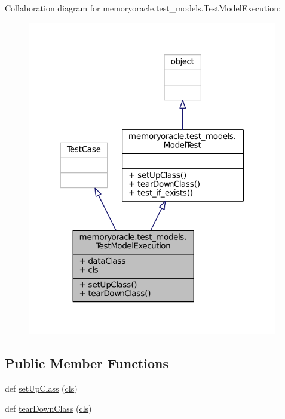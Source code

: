 Collaboration diagram for memoryoracle.\+test\+\_\+models.\+Test\+Model\+Execution\+:\nopagebreak
\begin{figure}[H]
\begin{center}
\leavevmode
\includegraphics[width=310pt]{classmemoryoracle_1_1test__models_1_1TestModelExecution__coll__graph}
\end{center}
\end{figure}
\subsection*{Public Member Functions}
\begin{DoxyCompactItemize}
\item 
def \hyperlink{classmemoryoracle_1_1test__models_1_1TestModelExecution_a0c2748985762f3637521bdf71e0f3041}{set\+Up\+Class} (\hyperlink{classmemoryoracle_1_1test__models_1_1TestModelExecution_a67c730d872df4d0d403311e6d9ea1cea}{cls})
\item 
def \hyperlink{classmemoryoracle_1_1test__models_1_1TestModelExecution_a731deb4f76d9df057e8eac9a7a38f1e9}{tear\+Down\+Class} (\hyperlink{classmemoryoracle_1_1test__models_1_1TestModelExecution_a67c730d872df4d0d403311e6d9ea1cea}{cls})
\end{DoxyCompactItemize}
